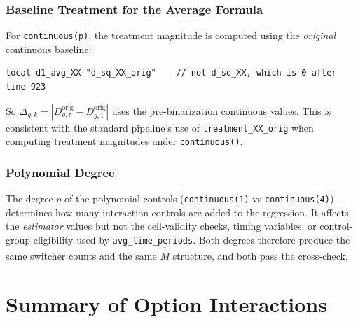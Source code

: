 \documentclass[11pt]{article}
\begin{document}
\subsubsection{Baseline Treatment for the Average Formula}

For \texttt{continuous(p)}, the treatment magnitude is computed using the
\emph{original} continuous baseline:

\begin{lstlisting}[language={}]
local d1_avg_XX "d_sq_XX_orig"    // not d_sq_XX, which is 0 after line 923
\end{lstlisting}

So $\Delta_{g,k} = |D_{g,\tau}^{\text{orig}} - D_{g,1}^{\text{orig}}|$ uses
the pre-binarization continuous values. This is consistent with the standard
pipeline's use of \texttt{treatment\_XX\_orig} when computing treatment
magnitudes under \texttt{continuous()}.

\subsubsection{Polynomial Degree}

The degree $p$ of the polynomial controls (\texttt{continuous(1)} vs
\texttt{continuous(4)}) determines how many interaction controls are added to
the regression. It affects the \emph{estimator} values but not the
cell-validity checks, timing variables, or control-group eligibility used by
\texttt{avg\_time\_periods}. Both degrees therefore produce the same switcher
counts and the same $\widehat{\overline{M}}$ structure, and both pass the
cross-check.

\section{Summary of Option Interactions}
\end{document}
